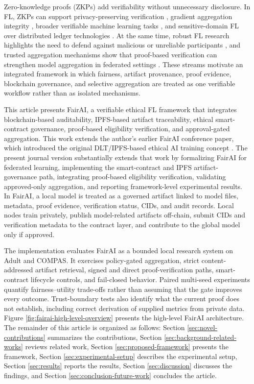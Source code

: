 \documentclass[futureinternet,article,submit,pdftex,moreauthors]{Definitions/mdpi}
\begin{document}
Zero-knowledge proofs (ZKPs) add verifiability without unnecessary disclosure. In FL, ZKPs can support privacy-preserving verification \cite{intro_9}, gradient aggregation integrity \cite{intro_10}, broader verifiable machine learning tasks \cite{intro_11}, and sensitive-domain FL over distributed ledger technologies \cite{intro_12}. At the same time, robust FL research highlights the need to defend against malicious or unreliable participants \cite{intro_13}, and trusted aggregation mechanisms show that proof-based verification can strengthen model aggregation in federated settings \cite{intro_14}. These streams motivate an integrated framework in which fairness, artifact provenance, proof evidence, blockchain governance, and selective aggregation are treated as one verifiable workflow rather than as isolated mechanisms.

This article presents FairAI, a verifiable ethical FL framework that integrates blockchain-based auditability, IPFS-based artifact traceability, ethical smart-contract governance, proof-based eligibility verification, and approval-gated aggregation. This work extends the author's earlier FairAI conference paper, which introduced the original DLT/IPFS-based ethical AI training concept \cite{intro_15}. The present journal version substantially extends that work by formalizing FairAI for federated learning, implementing the smart-contract and IPFS artifact-governance path, integrating proof-based eligibility verification, validating approved-only aggregation, and reporting framework-level experimental results. In FairAI, a local model is treated as a governed artifact linked to model files, metadata, proof evidence, verification status, CIDs, and audit records. Local nodes train privately, publish model-related artifacts off-chain, submit CIDs and verification metadata to the contract layer, and contribute to the global model only if approved.

The implementation evaluates FairAI as a bounded local research system on Adult and COMPAS. It exercises policy-gated aggregation, strict content-addressed artifact retrieval, signed and direct proof-verification paths, smart-contract lifecycle controls, and fail-closed behavior. Paired multi-seed experiments quantify fairness--utility trade-offs rather than assuming that the gate improves every outcome. Trust-boundary tests also identify what the current proof does not establish, including correct derivation of supplied metrics from private data. Figure \ref{fig:fairai-high-level-overview} presents the high-level FairAI architecture. The remainder of this article is organized as follows: Section \ref{sec:novel-contributions} summarizes the contributions, Section \ref{sec:background-related-works} reviews related work, Section \ref{sec:proposed-framework} presents the framework, Section \ref{sec:experimental-setup} describes the experimental setup, Section \ref{sec:results} reports the results, Section \ref{sec:discussion} discusses the findings, and Section \ref{sec:conclusion-future-work} concludes the article.
\end{document}
